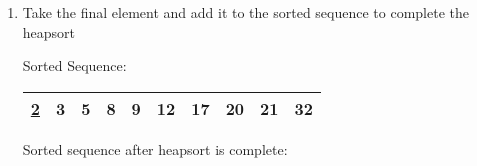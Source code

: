 \documentclass[fleqn, 12pt]{article}
\begin{document}
\begin{enumerate}[Step 1:]
\item Take the final element and add it to the sorted sequence to complete the heapsort
    \begin{center}
        Sorted Sequence:
        \begin{tabular}{|*{10}{c|}}
            \hline
            \underline{2} & 3 & 5 & 8 & 9 & 12 & 17 & 20 & 21 & 32\\
            \hline
        \end{tabular}
    \end{center}
    Sorted sequence after heapsort is complete:\\
    
\end{enumerate}
\end{document}
